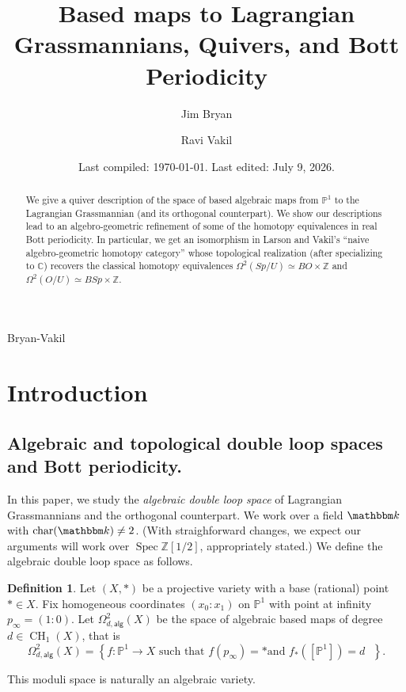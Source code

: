 \message{ !name(Bryan-Vakil.tex)}\documentclass{amsart}
\title{Based maps to Lagrangian Grassmannians, Quivers, and Bott Periodicity}
\date{Last compiled:  \today.  Last edited: July 9, 2026.}
\author{Jim Bryan}
\author{Ravi Vakil}
\theoremstyle{definition}
\newtheorem{definition}[theorem]{Definition}
\newcommand{\CC} {{\mathbb C}}          %
\newcommand{\ZZ} {{\mathbb Z}}		%
\newcommand{\kk} {{\mathbbm k}}
\newcommand{\PP}{\mathbb{P}}
\newcommand{\alg}{\mathsf{alg}}
\newcommand{\LoopTwo}{\Omega^{2}_{d,\alg}}
\newcommand{\homotopyeq}{\simeq}
\begin{document}


\begin{abstract}
We give a quiver description of the space of based algebraic maps from
$\PP^{1}$ to the Lagrangian Grassmannian (and its orthogonal
counterpart). We show our descriptions lead to an algebro-geometric
refinement of some of the homotopy equivalences in real Bott
periodicity. In particular, we get an isomorphism in Larson and
Vakil's ``naive algebro-geometric homotopy category''  whose topological
realization (after specializing to $\CC$) recovers the classical homotopy equivalences
$\Omega^{2}(Sp/U)\homotopyeq BO\times \ZZ$ and
$\Omega^{2}(O/U)\homotopyeq BSp\times \ZZ$.

\end{abstract}

\maketitle 

  {Bryan-Vakil}



\section{Introduction}\label{sec: intro}



\subsection{Algebraic and topological double loop spaces and Bott periodicity.}

In this paper, we study the \emph{algebraic double loop space} of
Lagrangian Grassmannians and the orthogonal counterpart. We work over
a field $\kk $ with $\operatorname{char}(\kk)\neq 2$.   (With straighforward changes, we expect our arguments will work over $\operatorname{Spec} \ZZ [1/2]$, appropriately stated.)  We define the
algebraic double loop space as follows.

\begin{definition}\label{defn: Omega2alg(X)}
Let $(X,*)$ be a projective variety with a base (rational) point $*\in X$. Fix homogeneous
coordinates $(x_{0}:x_{1})$ on $\PP^{1}$ with point at infinity
$p_{\infty}=(1:0)$. Let $\LoopTwo(X)$ be the space of algebraic based
maps of degree $d \in \operatorname{CH}_1(X)$, that is
\[
\LoopTwo (X) = \left\{f:\PP^{1}\to X\text{ such that $f(p_{\infty})=*$
and $f_{*}([\PP^{1}])=d$ } \right\} .
\]
\end{definition}
This moduli space is naturally an algebraic variety.
\end{document}
